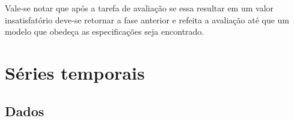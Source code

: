 \documentclass[
	12pt,
	oneside,
	a4paper,
	english,
	brazil
]{abntex2}
\begin{document}
Vale-se notar que após a tarefa de avaliação se essa resultar em um valor 
insatisfatório deve-se retornar a fase anterior e refeita a avaliação até que um 
modelo que obedeça as especificações seja encontrado.

\chapter{Séries temporais}

\section{Dados}

\postextual


\end{document}
